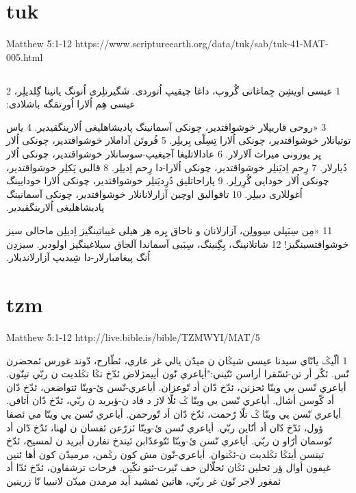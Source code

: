 \documentclass[12pt,fleqn,titlepage,twoside,a4paper]{book}
\begin{document}
\section{tuk}

Matthew 5:1-12 https://www.scriptureearth.org/data/tuk/sab/tuk-41-MAT-005.html

\begin{arab}[utf]

\section*{}

‏1 عیسی اویشِن جِماغاتی گُروپ، داغا چیقیپ اُتوردی.‏ شَگیرتلِری اُنونگ یانینا گِلدیلِر، ‏2 عیسی هِم اُلارا اُورِتمَگه باشلادی:‏

‏3 ‏«‏روحی قاریپلار خوشواقتدیر، 
چونکی آسمانینگ پادیشاهلیغی اُلارینگقیدیر.‏
‏4 یاس توتیانلار خوشواقتدیر،
چونکی اُلارا تِسِلّی بِریلِر.‏
‏5 فُروتَن آداملار خوشواقتدیر،
چونکی اُلار یِر یوزونی میراث آلارلار.‏
‏6 عادالاتلیغا آجیغیپ-سوسانلار خوشواقتدیر،
چونکی اُلار دُیارلار.‏
‏7 رِحم اِدیَنلِر خوشواقتدیر،
چونکی اُلارا-دا رِحم اِدیلِر.‏
‏8 قالبی پَکلِر خوشواقتدیر،
چونکی اُلار خودایی گُرِرلِر.‏
‏9 پاراحاتلیق دُرِدیَنلِر خوشواقتدیر،
چونکی اُلارا خودایینگ اُغول‍لاری دییلِر.‏
‏10 تاقوالیق اوچین آزارلانانلار خوشواقتدیر،
چونکی آسمانینگ پادیشاهلیغی اُلارینگقیدیر.‏


‏11 ‏«‏مِن سِبَپلی سِوولِن، آزارلانان و ناحاق یِره هِر هیلی غیباتینگیز اِدیلِن ماحالی سیز خوشواقتسینگیز!‏ ‏12 شاتلانینگ، بِگِنینگ، سِبَبی آسماندا آلجاق سیلاغینگیز اولودیر.‏ سیزدِن اُنگ پیغامبارلار-دا شِیدیپ آزارلاندیلار.‏ 

\end{arab}

\section{tzm}

Matthew 5:1-12 http://live.bible.is/bible/TZMWYI/MAT/5

\begin{arab}[utf]


‏1 ألّيݣ يانّاي سيدنا عيسى شيݣان ن ميدّن يالي غر عاري، ئطّارح، دّوند غورس ئمحضرن نّس. ئكّر أر تن-ئسّقرا أراسن ئتّيني:"أياعري نّون أييمژلاض ئدّخ تݣا تݣلديت ن ربّي تينّون. أياعري نّسن يي وينّا ئحزنن، ئدّخ دّان أد تّوعزان. أياعري-نّسن ئ-وينّا ئتواضعن، ئدّخ دّان أد كّوسن أشال. أياعري نّسن يي وينّا ݣ ئلّا لاژ د فاد ن-ؤبريد ن ربّي، ئدّخ دّان أتافن. أياعري نّسن يي وينّا ݣ تلّا رّحمت، ئدّخ دّان أد تّورحمن. أياعري نّسن يي وينّا مي ئصفا ؤول، ئدّخ دّان أد أنّاين ربّي. أياعري نّسن ئ-وينّا ئزرّعن ئفسان ن لهنا، ئدّخ دّان أد تّوسمان أرّاو ن ربّي. أياعري نّسن ئ-وينّا ئتّوعدّابن ئيتدخ تفارن أبريد ن لمسيح، ئدّخ تينسن أيتݣا تݣلديت ن-ئݣنوان. أياعري-نّون مش كون رݣمن، مرميدّن كون أها ئنين غيفون أوال ؤر ئحلين ئݣان ئحلّالن خف نّيرت-ئنو نكّين. فرحات ترشقاون، ئدّخ ئدّا أد ئمغور لاجر نّون غر ربّي، هاثين ئمشيد أيد مرمدن ميدّن لانبييا نّا زرينين


\end{arab}
\end{document}
